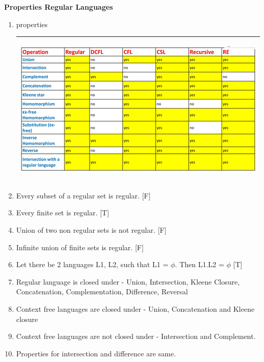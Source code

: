 
\centerline{\textbf{ \LARGE  Properties Regular Languages }}

\begin{enumerate}
    \item properties \\
        \begin{myTableStyle} \begin{tabular}{ |m{14cm}| } \hline
               \begin{center} \includegraphics[scale=3.5]{./images/properties.jpeg}  \end{center}\\\hline
        \end{tabular}\end{myTableStyle} \vspace{0.08in}
    \item Every subset of a regular set is regular. [F]
    \item Every finite set is regular. [T]
    \item Union of two non regular sets is not regular. [F]
    \item Infinite union of finite sets is regular. [F]
    \item Let there be 2 languages L1, L2, such that L1 = {\large \( \phi \)}. Then L1.L2 = {\large \(\phi\) } [T]
    \item Regular language is closed under - Union, Intersection, Kleene Closure, Concatenation, Complementation, Difference, Reversal
    \item Context free languages are closed under - Union, Concatenation and Kleene closure
    \item Context free languages are not closed under - Intersection and Complement.
    \item Properties for intersection and difference are same.

\end{enumerate}

